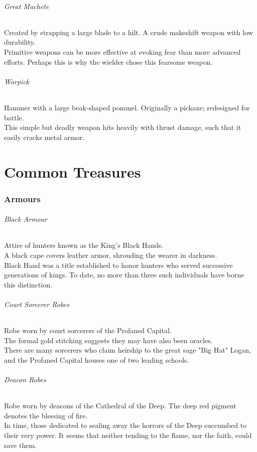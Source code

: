 \documentclass[twocolumn,a4paper]{article}
\begin{document}
\paragraph{Great Machete}
Created by strapping a large blade to a hilt. A crude makeshift weapon with low durability.\\
Primitive weapons can be more effective at evoking fear than more advanced efforts. Perhaps this is why the wielder chose this fearsome weapon.
\paragraph{Warpick}
Hammer with a large beak-shaped pommel. Originally a pickaxe; redesigned for battle.\\
This simple but deadly weapon hits heavily with thrust damage, such that it easily cracks metal armor.

\newpage
\part{Common Treasures}
\section*{Armours}
\paragraph{Black Armour}
Attire of hunters known as the King's Black Hands.\\
A black cape covers leather armor, shrouding the wearer in darkness.\\
Black Hand was a title established to honor hunters who served successive generations of kings. To date, no more than three such individuals have borne this distinction.
\paragraph{Court Sorcerer Robes}
Robe worn by court sorcerers of the Profaned Capital.\\
The formal gold stitching suggests they may have also been oracles.\\
There are many sorcerers who claim heirship to the great sage "Big Hat" Logan, and the Profaned Capital houses one of two leading schools.
\paragraph{Deacon Robes}
Robe worn by deacons of the Cathedral of the Deep. The deep red pigment denotes the blessing of fire.\\
In time, those dedicated to sealing away the horrors of the Deep succumbed to their very power. It seems that neither tending to the flame, nor the faith, could save them.
\end{document}

